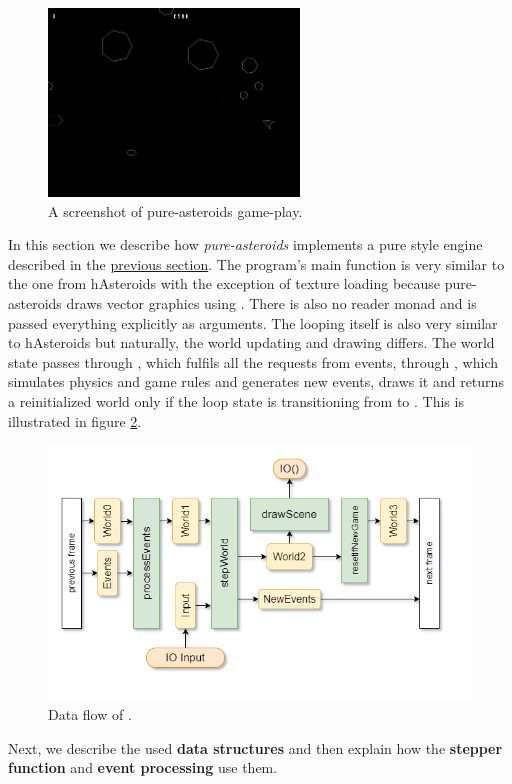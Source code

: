 \documentclass[
  digital, %
  color,   %
  table,   %
  oneside, %
  lof,     %
  lot,     %
]{fithesis3}
\begin{document}
\begin{figure}[hbt!]
    \centering
    \includegraphics[height=5cm]{images/pure-screenshot.png}
    \caption{A screenshot of pure-asteroids game-play.}
    \label{fig:pureasteroidsscreenshot}
\end{figure}

In this section we describe how \emph{pure-asteroids} implements a pure style engine described
in the \hyperref[sect:pureengines]{previous section}.
The program's main function is very similar to the one from
hAsteroids with the exception of texture loading because pure-asteroids
draws vector graphics using . There is also no reader monad
and  is passed everything explicitly as arguments.
The looping itself is also very similar to hAsteroids but naturally,
the world updating and drawing differs. The world state passes through
, which fulfils all the requests from events,
through , which simulates physics and game rules and generates new events,
 draws it and  returns a reinitialized
world only if the loop state is transitioning from  to .
This is illustrated in figure \ref{fig:worldeventsflow}.
\begin{figure}
    \centering
    \includegraphics[width=\textwidth]{images/world-flow-detailed.png}
    \caption{Data flow of .}
    \label{fig:worldeventsflow}
\end{figure}
Next, we describe the used \textbf{data structures} and then explain
how the \textbf{stepper function} and \textbf{event processing} use them.
\end{document}
